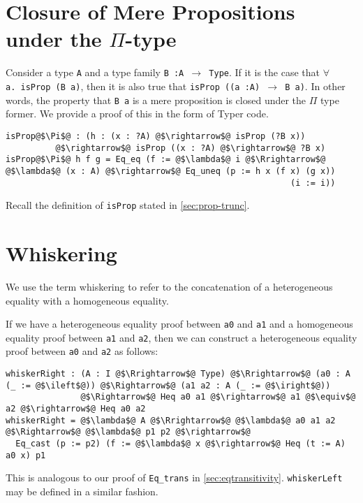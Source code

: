 \documentclass[12pt,twoside,maitrise]{dms}
\theoremstyle{definition}
\numberwithin{equation}{section}
\numberwithin{table}{chapter}
\numberwithin{figure}{chapter}
\newcommand\id[1] {\texttt{#1}}
\newcommand\fn[1] {\texttt{#1}}
\begin{document}
\section{Closure of Mere Propositions under the $\Pi$-type}\label{app:closure-mp-pi}

Consider a type \id{A} and a type family \fn{B :\@ A $\rightarrow$ Type}.
If it is the case that \fn{$\forall$ a.\ isProp (B a)}, then it is also true that
\fn{isProp ((a :\@ A) $\rightarrow$ B a)}. In other words, the property that \fn{B
  a} is a mere proposition is closed under the $\Pi$ type former. We provide a proof of this in the form of Typer code.

\begin{verbatim}
isProp@$\Pi$@ : (h : (x : ?A) @$\rightarrow$@ isProp (?B x))
          @$\rightarrow$@ isProp ((x : ?A) @$\rightarrow$@ ?B x)
isProp@$\Pi$@ h f g = Eq_eq (f := @$\lambda$@ i @$\Rrightarrow$@ @$\lambda$@ (x : A) @$\rightarrow$@ Eq_uneq (p := h x (f x) (g x))
                                                         (i := i))
\end{verbatim}

Recall the definition of \id{isProp} stated in \autoref{sec:prop-trunc}.

\section{Whiskering}\label{app:whiskering}

We use the term whiskering to refer to the concatenation of a heterogeneous
equality with a homogeneous equality.

If we have a heterogeneous equality proof between \id{a0} and \id{a1} and a
homogeneous equality proof between \id{a1} and \id{a2}, then we can construct a
heterogeneous equality proof between \id{a0} and \id{a2} as follows:

\begin{verbatim}
whiskerRight : (A : I @$\Rrightarrow$@ Type) @$\Rrightarrow$@ (a0 : A (_ := @$\ileft$@)) @$\Rightarrow$@ (a1 a2 : A (_ := @$\iright$@))
               @$\Rightarrow$@ Heq a0 a1 @$\rightarrow$@ a1 @$\equiv$@ a2 @$\rightarrow$@ Heq a0 a2
whiskerRight = @$\lambda$@ A @$\Rrightarrow$@ @$\lambda$@ a0 a1 a2 @$\Rightarrow$@ @$\lambda$@ p1 p2 @$\rightarrow$@
  Eq_cast (p := p2) (f := @$\lambda$@ x @$\rightarrow$@ Heq (t := A) a0 x) p1
\end{verbatim}


This is analogous to our proof of \id{Eq\_trans} in
\autoref{sec:eqtransitivity}. \id{whiskerLeft} may be defined in a similar
fashion.
\end{document}
